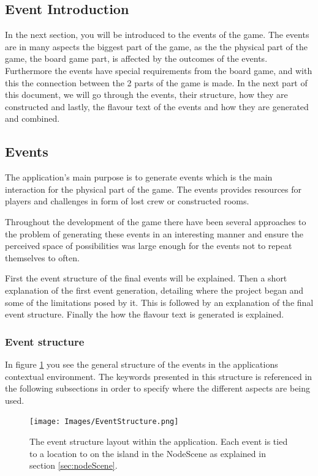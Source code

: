 \subsection{Event Introduction}
In the next section, you will be introduced to the events of the game. The events are in many aspects the biggest part of the game, as the the physical part of the game, the board game part, is affected by the outcomes of the events. Furthermore the events have special requirements from the board game, and with this the connection between the 2 parts of the game is made.
In the next part of this document, we will go through the events, their structure, how they are constructed and lastly, the flavour text of the events and how they are generated and combined.

\subsection{Events}
\label{sec:eve}
The application's main purpose is to generate events which is the main interaction for the physical part of the game. The events provides resources for players and challenges in form of lost crew or constructed rooms.

Throughout the development of the game there have been several approaches to the problem of generating these events in an interesting manner and ensure the perceived space of possibilities was large enough for the events not to repeat themselves to often.

First the event structure of the final events will be explained. Then a short explanation of the first event generation, detailing where the project began and some of the limitations posed by it. This is followed by an explanation of the final event structure. Finally the how the flavour text is generated is explained.

\subsubsection{Event structure}
In figure \ref{fig:eStruc} you see the general structure of the events in the applications contextual environment. The keywords presented in this structure is referenced in the following subsections in order to specify where the different aspects are being used.

\begin{figure}[!ht]
    \centering
    \texttt{[image: Images/EventStructure.png]}
    \caption{The event structure layout within the application. Each event is tied to a location to on the island in the NodeScene as explained in section \ref{sec:nodeScene}.}
    \label{fig:eStruc}
\end{figure}

